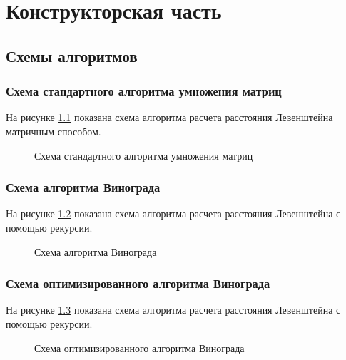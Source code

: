 
\chapter{Конструкторская часть}\label{Konstruct}

\section{Схемы алгоритмов}\label{SchemaAlg}


\subsection{Схема стандартного алгоритма умножения матриц}\label{SchemaMatrixMultiply}

На рисунке \ref{ris:schemastandart} показана схема алгоритма расчета расстояния Левенштейна матричным способом.

\begin{figure}[H]
  \caption{Схема стандартного алгоритма умножения матриц}
  \label{ris:schemastandart}
\end{figure}


\subsection{Схема алгоритма Винограда}\label{SchemaMatrixVinograd}

На рисунке \ref{ris:schemavinograd} показана схема алгоритма расчета расстояния Левенштейна с помощью рекурсии.

\begin{figure}[H]
    \caption{Схема алгоритма Винограда}
    \label{ris:schemavinograd}
\end{figure}

\subsection{Схема оптимизированного алгоритма Винограда}\label{SchemaMatrixOptimVinograd}

На рисунке \ref{ris:schemaoptvinograd} показана схема алгоритма расчета расстояния Левенштейна с помощью рекурсии.

\begin{figure}[H]
    \caption{Схема оптимизированного алгоритма Винограда}
    \label{ris:schemaoptvinograd}
\end{figure}

